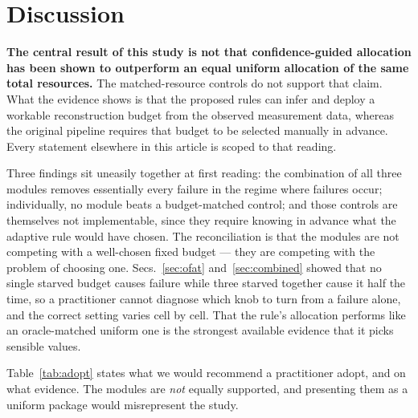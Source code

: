 \section{Discussion}
\label{sec:discussion}

\textbf{The central result of this study is not that confidence-guided
allocation has been shown to outperform an equal uniform allocation of
the same total resources.} The matched-resource controls do not support
that claim. What the evidence shows is that the proposed rules can infer
and deploy a workable reconstruction budget from the observed measurement
data, whereas the original pipeline requires that budget to be selected
manually in advance. Every statement elsewhere in this article is scoped
to that reading.

Three findings sit uneasily together at first reading: the combination
of all three modules removes essentially every failure in the regime
where failures occur; individually, no module beats a budget-matched
control; and those controls are themselves not implementable, since they
require knowing in advance what the adaptive rule would have chosen. The
reconciliation is that the modules are not competing with a well-chosen
fixed budget --- they are competing with the problem of choosing one.
Secs.~\ref{sec:ofat} and~\ref{sec:combined} showed that no single starved
budget causes failure while three starved together cause it half the time, so a
practitioner cannot diagnose which knob to turn from a failure alone, and
the correct setting varies cell by cell. That the rule's allocation
performs like an oracle-matched uniform one is the strongest available
evidence that it picks sensible values.

Table~\ref{tab:adopt} states what we would recommend a practitioner
adopt, and on what evidence. The modules are \emph{not} equally
supported, and presenting them as a uniform package would misrepresent
the study.

